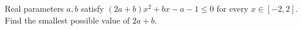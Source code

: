 Real parameters $a,b$ satisfy $(2a+b)x^2+bx-a-1\le0$ for every $x\in[-2,2]$. Find the smallest possible value of $2a+b$.
